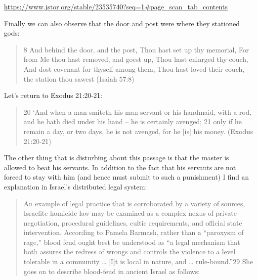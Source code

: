 \documentclass[11pt]{article}
\begin{document}
{\url{https://www.jstor.org/stable/23535740?seq=1#page_scan_tab_contents}







Finally we can also observe that the door and post were where they stationed gods:
\begin{quote}
8 And behind the door, and the post, Thou hast set up thy memorial, For from Me thou hast removed, and goest up, Thou hast enlarged thy couch, And dost covenant for thyself among them, Thou hast loved their couch, the station thou sawest (Isaiah 57:8)
\end{quote}

Let's return to Exodus 21:20-21:
\begin{quote}
20 `And when a man smiteth his man-servant or his handmaid, with a rod, and he hath died under his hand -- he is certainly avenged;
21 only if he remain a day, or two days, he is not avenged, for he [is] his money. (Exodus 21:20-21)
\end{quote}

The other thing that is disturbing about this passage is that the master is allowed to beat his servants. In addition to the fact that his servants are not forced to stay with him (and hence must submit to such a punishment) I find an explanation in Israel's distributed legal system:
\begin{quote}
An example of legal practice that is corroborated by a variety of sources, Israelite homicide law may be examined as a complex nexus of private negotiation, procedural guidelines, cultic requirements, and official state intervention. According to Pamela Barmash, rather than a “paroxysm of rage,” blood feud ought best be understood as “a legal mechanism that both assures the redress of wrongs and controls the violence to a level tolerable in a community … [I]t is local in nature, and … rule-bound.”29 She goes on to describe blood-feud in ancient Israel as follows:
\begin{quote}


\end{quote}
\end{quote}}
\end{document}
